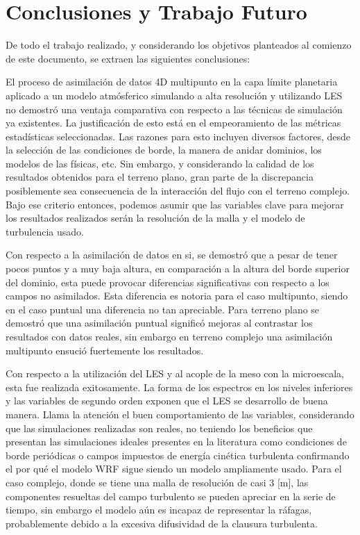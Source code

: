 \chapter{Conclusiones y Trabajo Futuro}
De todo el trabajo realizado, y considerando los objetivos planteados al comienzo de este documento, se extraen las siguientes conclusiones:

\begin{itemize*}
	\item El proceso de asimilación de datos 4D multipunto en la capa límite planetaria aplicado a un modelo atmósferico simulando a alta resolución y utilizando LES no demostró una ventaja comparativa con respecto a las técnicas de simulación ya existentes. La justificación de esto está en el empeoramiento de las métricas estadísticas seleccionadas. Las razones para esto incluyen diversos factores, desde la selección de las condiciones de borde, la manera de anidar dominios, los modelos de las físicas, etc. Sin embargo, y considerando la calidad de los resultados obtenidos para el terreno plano, gran parte de la discrepancia posiblemente sea consecuencia de la interacción del flujo con el terreno complejo. Bajo ese criterio entonces, podemos asumir que las variables clave para mejorar los resultados realizados serán la resolución de la malla y el modelo de turbulencia usado.
	\item Con respecto a la asimilación de datos en si, se demostró que a pesar de tener pocos puntos y a muy baja altura, en comparación a la altura del borde superior del dominio, esta puede provocar diferencias significativas con respecto a los campos no asimilados. Esta diferencia es notoria para el caso multipunto, siendo en el caso puntual una diferencia no tan apreciable. Para terreno plano se demostró que una asimilación puntual significó mejoras al contrastar los resultados con datos reales, sin embargo en terreno complejo una asimilación multipunto ensució fuertemente los resultados.
	\item Con respecto a la utilización del LES y al acople de la meso con la microescala, esta fue realizada exitosamente. La forma de los espectros en los niveles inferiores y las variables de segundo orden exponen que el LES se desarrollo de buena manera. Llama la atención el buen comportamiento de las variables, considerando que las simulaciones realizadas son reales, no teniendo los beneficios que presentan las simulaciones ideales presentes en la literatura como condiciones de borde periódicas o campos impuestos de energía cinética turbulenta confirmando el por qué el modelo WRF sigue siendo un modelo ampliamente usado. Para el caso complejo, donde se tiene una malla de resolución de casi 3 [m], las componentes resueltas del campo turbulento se pueden apreciar en la serie de tiempo, sin embargo el modelo aún es incapaz de representar la ráfagas, probablemente debido a la excesiva difusividad de la clausura turbulenta.

\end{itemize*}
